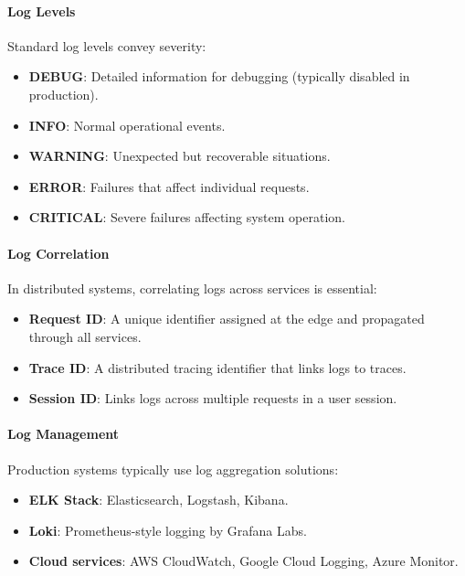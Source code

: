 \paragraph{Log Levels}

Standard log levels convey severity:
\begin{itemize}
    \item \textbf{DEBUG}: Detailed information for debugging (typically disabled in production).
    \item \textbf{INFO}: Normal operational events.
    \item \textbf{WARNING}: Unexpected but recoverable situations.
    \item \textbf{ERROR}: Failures that affect individual requests.
    \item \textbf{CRITICAL}: Severe failures affecting system operation.
\end{itemize}

\paragraph{Log Correlation}

In distributed systems, correlating logs across services is essential:
\begin{itemize}
    \item \textbf{Request ID}: A unique identifier assigned at the edge and propagated through all services.
    \item \textbf{Trace ID}: A distributed tracing identifier that links logs to traces.
    \item \textbf{Session ID}: Links logs across multiple requests in a user session.
\end{itemize}

\paragraph{Log Management}

Production systems typically use log aggregation solutions:
\begin{itemize}
    \item \textbf{ELK Stack}: Elasticsearch, Logstash, Kibana.
    \item \textbf{Loki}: Prometheus-style logging by Grafana Labs.
    \item \textbf{Cloud services}: AWS CloudWatch, Google Cloud Logging, Azure Monitor.
\end{itemize}

